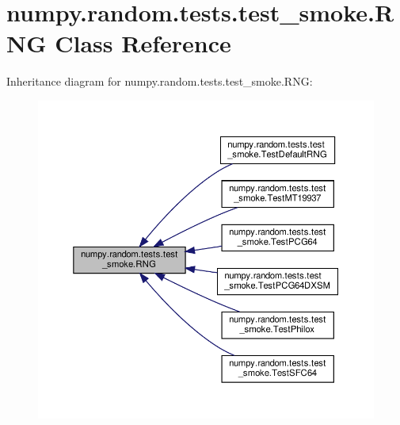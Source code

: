 \hypertarget{classnumpy_1_1random_1_1tests_1_1test__smoke_1_1RNG}{}\section{numpy.\+random.\+tests.\+test\+\_\+smoke.\+R\+NG Class Reference}
\label{classnumpy_1_1random_1_1tests_1_1test__smoke_1_1RNG}


Inheritance diagram for numpy.\+random.\+tests.\+test\+\_\+smoke.\+R\+NG\+:
\nopagebreak
\begin{figure}[H]
\begin{center}
\leavevmode
\includegraphics[width=350pt]{classnumpy_1_1random_1_1tests_1_1test__smoke_1_1RNG__inherit__graph}
\end{center}
\end{figure}
